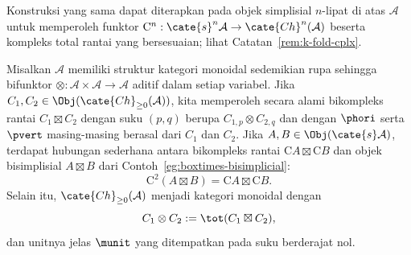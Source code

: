 Konstruksi yang sama dapat diterapkan pada objek simplisial $n$-lipat di
atas $\mathcal{A}$ untuk memperoleh funktor
$\mathrm{C}^n:\cate{s}^n\mathcal{A}\to\cate{Ch}^n(\mathcal{A})$ beserta
kompleks total rantai yang bersesuaian; lihat
Catatan~\ref{rem:k-fold-cplx}.

\begin{example}\label{eg:tensor-bisimplicial}
	Misalkan $\mathcal{A}$ memiliki struktur kategori monoidal sedemikian
	rupa sehingga bifunktor
	$\otimes:\mathcal{A}\times\mathcal{A}\to\mathcal{A}$ aditif dalam
	setiap variabel. Jika
	$C_1,C_2\in\Obj(\cate{Ch}_{\geq0}(\mathcal{A}))$, kita memperoleh
	secara alami bikompleks rantai $C_1\boxtimes C_2$ dengan suku
	$(p,q)$ berupa $C_{1,p}\otimes C_{2,q}$ dan dengan $\phori$ serta
	$\pvert$ masing-masing berasal dari $C_1$ dan $C_2$. Jika
	$A,B\in\Obj(\cate{s}\mathcal{A})$, terdapat hubungan sederhana antara
	bikompleks rantai $\mathrm{C}A\boxtimes\mathrm{C}B$ dan objek
	bisimplisial $A\boxtimes B$ dari Contoh~\ref{eg:boxtimes-bisimplicial}:
	\[ \mathrm{C}^2 (A \boxtimes B) = \mathrm{C}A \boxtimes \mathrm{C}B. \]
	Selain itu, $\cate{Ch}_{\geq0}(\mathcal{A})$ menjadi kategori
	monoidal dengan
	\[ C_1 \otimes C_2 := \tot(C_1 \boxtimes C_2), \]
	dan unitnya jelas $\munit$ yang ditempatkan pada suku berderajat nol.
\end{example}
